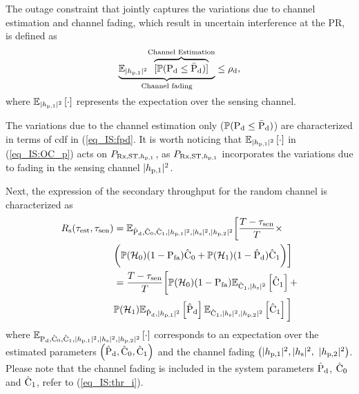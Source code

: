 The outage constraint that jointly captures the variations due to channel estimation and channel fading, which result in uncertain interference at the PR, is defined as 
\begin{align}
\smash[b]{\underbrace{\mathbb{E}_{\phpo}{\smash[b]{\overbrace{[\p( \pd \le \pdd)]}^{\text{Channel Estimation}}}}}_{\text{Channel fading}}} &\le \mpd, \label{eq_IS:OC_p} \\[-0.1em] \nonumber 
\end{align}
where $\e{\phpo}{\cdot}$ represents the expectation over the sensing channel. 

The variations due to the channel estimation only ($\p(\pd \le \pdd)$) are characterized in terms of cdf in (\ref{eq_IS:fpd}.
It is worth noticing that $\e{\phpo}{\cdot}$ in (\ref{eq_IS:OC_p}) acts on $\prcvdstpt$, as $\prcvdstpt$ incorporates the variations due to fading in the sensing channel $\phpo$.

Next, the expression of the secondary throughput for the random channel is characterized as 
\begin{align}
\rs(\test, \tsen) &= \mathbb{E}_{\epd,\ecz,\eco,\phpo, \phs, \phpt} \bigg[ \frac{T - \tsen}{T} \times \nonumber \\ & \bigg( \phz (1 - \pfa) \ecz + \pho (1 -\epd) \eco \bigg) \bigg] \label{eq_IS:thr_p} \\
  \quad &= \frac{T - \tsen}{T} \bigg[ \phz (1 - \pfa) \e{\eco, \phs}{\eco} + \nonumber \\ & \pho \e{\epd, \phpo}{\epd} \e{\eco, \phs, \phpt}{\eco} \bigg] \nonumber 
\end{align}
where $\e{\pd,\ecz,\eco,\phpo, \phs, \phpt}{\cdot}$ corresponds to an expectation over the estimated parameters $\left( \epd, \ecz, \eco \right)$ and the channel fading $\big(\phpo, \phs,$ $\phpt \big)$. Please note that the channel fading is included in the system parameters $\epd$, $\ecz$ and $\eco$, refer to (\ref{eq_IS:thr_i}).

